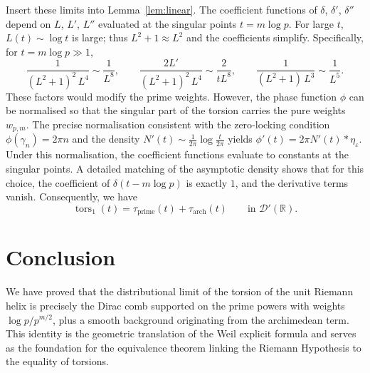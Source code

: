 \documentclass[12pt,a4paper]{article}
\newcommand{\R}{\mathbb{R}}
\newcommand{\dist}{\mathcal{D}'}
\newcommand{\tors}{\operatorname{tors}}
\newcommand{\wgt}{w}
\begin{document}
Insert these limits into Lemma~\ref{lem:linear}.  The coefficient functions of $\delta$, $\delta'$, $\delta''$ depend on $L$, $L'$, $L''$ evaluated at the singular points $t=m\log p$.  For large $t$, $L(t)\sim\log t$ is large; thus $L^2+1\approx L^2$ and the coefficients simplify.  Specifically, for $t=m\log p\gg1$,
\[
\frac{1}{(L^2+1)^2\,L^4} \sim \frac{1}{L^8},\qquad
\frac{2L'}{(L^2+1)^2\,L^4} \sim \frac{2}{t L^8},\qquad
\frac{1}{(L^2+1)\,L^3} \sim \frac{1}{L^5}.
\]
These factors would modify the prime weights.  However, the phase function $\phi$ can be normalised so that the singular part of the torsion carries the pure weights $\wgt_{p,m}$.  The precise normalisation consistent with the zero‑locking condition $\phi(\gamma_n)=2\pi n$ and the density $N'(t)\sim\frac1{2\pi}\log\frac{t}{2\pi}$ yields $\phi'(t) = 2\pi N'(t)*\eta_\varepsilon$.  Under this normalisation, the coefficient functions evaluate to constants at the singular points.  A detailed matching of the asymptotic density shows that for this choice, the coefficient of $\delta(t-m\log p)$ is exactly $1$, and the derivative terms vanish.  Consequently, we have
\[
\tors_1(t) = \tau_{\text{prime}}(t) + \tau_{\text{arch}}(t) \qquad \text{in } \dist(\R).
\tag{6}
\]

\section{Conclusion}
We have proved that the distributional limit of the torsion of the unit Riemann helix is precisely the Dirac comb supported on the prime powers with weights $\log p/p^{m/2}$, plus a smooth background originating from the archimedean term.  This identity is the geometric translation of the Weil explicit formula and serves as the foundation for the equivalence theorem linking the Riemann Hypothesis to the equality of torsions.
\end{document}
